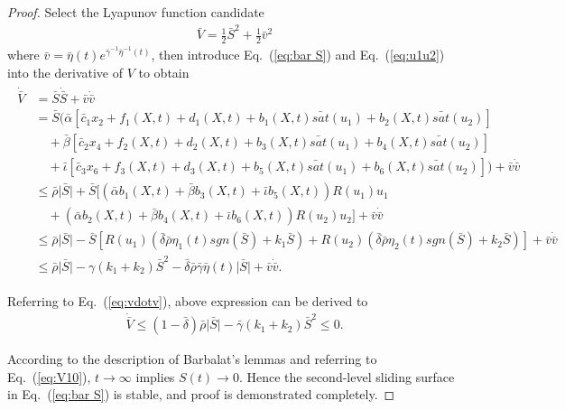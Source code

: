 \begin{proof}
Select the Lyapunov function candidate
\begin{align}
\bar V = \frac{1}{2}\bar S^2 + \frac{1}{2}\bar v^2
\end{align}
where $\bar v = {\bar\eta}(t)e^{\bar\gamma^{-1}{\bar\eta}^{-1}(t)}$, then introduce Eq.~(\ref{eq:bar S}) and Eq.~(\ref{eq:u1u2}) into the derivative of $V$ to obtain
\begin{align}
\begin{split}
\dot{\bar V} &= \bar{S}\dot{\bar{S}}+\bar v\dot{\bar v}\\
                &= \bar{S}(\bar\alpha[\bar c_1 x_2 + f_1(X,t) + d_1(X,t) + b_1(X,t)\bar{sat}(u_1) + b_2(X,t)\bar{sat}(u_2)]\\
                     &\quad+         \bar\beta [\bar c_2 x_4 + f_2(X,t) + d_2(X,t) + b_3(X,t)\bar{sat}(u_1) + b_4(X,t)\bar{sat}(u_2)]\\
                     &\quad+         \bar\iota[\bar c_3 x_6 + f_3(X,t) + d_3(X,t) + b_5(X,t)\bar{sat}(u_1) + b_6(X,t)\bar{sat}(u_2)])+\bar v\dot{\bar v}\\
                     &\le \bar\rho\vert\bar S\vert + \bar S[(\bar\alpha b_1(X,t) + \bar\beta b_3(X,t) + \bar\iota b_5(X,t))R(u_1)u_1\\
                     &\quad+(\bar\alpha b_2(X,t) + \bar\beta b_4(X,t) + \bar\iota b_6(X,t))R(u_2)u_2]+\bar v\dot{\bar v}\\
                     &\le \bar\rho\vert\bar S\vert - \bar S[ R(u_1)(\bar\delta\bar\rho\eta_1(t)sgn(\bar S)+k_1\bar S)+R(u_2)(\bar\delta\bar\rho\eta_2(t)sgn(\bar S)+k_2\bar S)]+\bar v\dot{\bar v}\\
                     &\le \bar\rho\vert\bar S\vert - \gamma(k_1+k_2)\bar S^2 - \bar\delta\bar\rho\bar\gamma\bar\eta(t)\vert\bar S\vert+\bar v\dot{\bar v}.
\end{split}
\end{align}\par
Referring to Eq.~(\ref{eq:vdotv}), above expression can be derived to
\begin{align}
\dot{\bar V} \le (1 -\bar\delta)\bar\rho\vert\bar S\vert- \bar\gamma(k_1+k_2)\bar S^2\le 0 .\label{eq:dotbarVfinal}
\end{align}\par
According to the description of Barbalat's lemmas and referring to Eq.~(\ref{eq:V10}), $t\to\infty$ implies $S(t)\to 0$. Hence the second-level sliding surface in Eq.~(\ref{eq:bar S}) is stable, and proof is demonstrated completely.
\end{proof}
